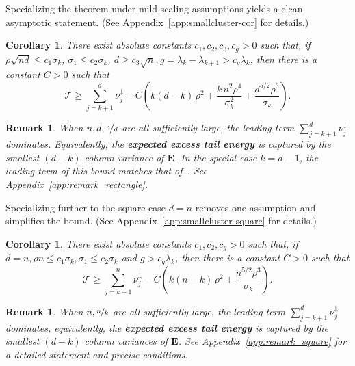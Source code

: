 \documentclass{article}
\newcommand{\Eb}{\mathbf{E}}
\newcommand{\Tcal}{\mathcal{T}}
\newcommand{\BlackBox}{\rule{1.5ex}{1.5ex}}  %
\newenvironment{proof}{\par\noindent{\bf Proof\ }}{\hfill\BlackBox\par\medskip}
\newtheorem{remark}[theorem]{Remark}
\newtheorem{corollary}[theorem]{Corollary}
\newcommand{\rbr}[1]{\left(#1\right)}
\begin{document}
Specializing the theorem under mild scaling assumptions yields a clean asymptotic statement. (See Appendix~\ref{app:smallcluster-cor} for details.)

\begin{corollary}\label{cor:smallcluster}
There exist absolute constants $c_1, c_2, c_3, c_g > 0$ such that, if $\rho\sqrt{nd} \le c_1\sigma_k$, $\sigma_1 \le c_2\sigma_k$, $d \ge c_3\sqrt n, g= \lambda_k - \lambda_{k+1} > c_g \lambda_k$, then there is a constant $C > 0$ such that
\begin{equation*}
    \Tcal \ge \sum_{j=k+1}^{d}\nu_j^\downarrow - C\rbr{k(d-k)\,\rho^2 + \frac{k\,n^2 \rho^4}{\sigma_k^2} + \frac{d^{5/2}\rho^3}{\sigma_k}}.
\end{equation*}
\end{corollary}


\begin{remark}\label{remark:rectangle}
When $n,d,\nicefrac{n}{d}$ are all sufficiently large, the leading term $\sum_{j=k+1}^{d}\nu_j^\downarrow$ dominates. Equivalently, the \textbf{expected excess tail energy} is captured by the smallest $(d-k)$ column variance of $\Eb$. In the special case $k = d-1$, the leading term of this bound matches that of~\citep{dexter2025stochastic}. See Appendix~\ref{app:remark_rectangle}.
\end{remark}

Specializing further to the square case $d=n$ removes one assumption and simplifies the bound. (See Appendix~\ref{app:smallcluster-square} for details.)

\begin{corollary}\label{cor:smallcluster-square}
There exist absolute constants $c_1, c_2, c_g > 0$ such that, if $d = n, \rho n \le c_1\sigma_k, \sigma_1 \le c_2\sigma_k$ and $g>c_g \lambda_k$, then there is a constant $C > 0$ such that
\begin{equation*}
    \Tcal \ge \sum_{j=k+1}^{n}\nu_j^\downarrow - C\rbr{k(n-k)\,\rho^2 + \frac{n^{5/2}\rho^3}{\sigma_k}}.
\end{equation*}
\end{corollary}

\begin{remark}\label{remark:square}
When $n,\nicefrac{n}{k}$ are all sufficiently large, the leading term $\sum_{j=k+1}^{d}\nu_j^\downarrow$ dominates, equivalently, the \textbf{expected excess tail energy} is captured by the smallest $(d-k)$ column variances of $\Eb$. See Appendix~\ref{app:remark_square} for a detailed statement and precise conditions.



\end{remark}
%
\end{document}
